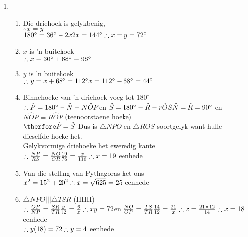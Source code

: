  \begin{solutions}{}{
\begin{enumerate}[itemsep=5pt, label=\textbf{\arabic*}. ] 


\item %
      \begin{enumerate}[noitemsep, label=\textbf{(\alph*)} ]
\item Die driehoek is gelykbenig,\\ $\therefore x=y$\\
$180^{\circ} = 36^{\circ}-2x\\
2x=144^{\circ}\\
\therefore x=y=72^{\circ}$
\item $x$ is 'n buitehoek\\
$\therefore x=30^{\circ}+68^{\circ} \\
=98^{\circ}$
\item $y$ is 'n buitehoek\\
$\therefore y = x+68^{\circ}= 112^{\circ}\\
x=112^{\circ}-68^{\circ} = 44^{\circ}$
\item Binnehoeke van 'n driehoek voeg tot $180^{\circ}$\\
$\therefore \hat{P} = 180^{\circ} - \hat{N} - N\hat{O}P\\
$en $\hat{S} = 180^{\circ} - \hat{R} - r\hat{O}S\\
\hat{N} = \hat{R} = 90^{\circ}$ en $N\hat{O}P = R\hat{O}P$ (teenoorstaene hoeke)\\
$\therfore \hat{P} = \hat{S}\\$
Dus is $\triangle NPO$ en $\triangle ROS$ soortgelyk want hulle dieselfde hoeke het.\\
Gelykvormige driehoeke het eweredig kante\\
$\therefore \frac{NP}{RS} = \frac{NO}{OR}\\
\frac{19}{76}=\frac{x}{116}\\
\therefore x = 19$ eenhede

 
\item Van die stelling van Pythagoras het ons\\
$x^2 = 15^2 + 20^2\\
\therefore x = \sqrt{625}\\
=25$ eenhede
\item $\triangle NPO ||| \triangle TSR$ (HHH)\\
$\therefore \frac{OP}{NP} = \frac{SR}{TR}\\
\frac{y}{12}=\frac{6}{x}\\
\therefore xy=72\\
$en $\frac{NO}{OP} = \frac{TS}{TR}\\
\frac{14}{12} = \frac{21}{x}\\
\therefore x = \frac{21 \times 12}{14}\\
\therefore x = 18$ eenhede\\
$\therefore y(18)=72\\
\therefore y=4$ eenhede



\end{enumerate}
\end{enumerate}}
\end{solutions}
